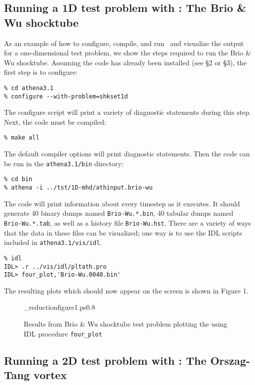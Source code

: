 \subsection{Running a 1D test problem with \ath: The Brio \& Wu shocktube}

As an example of how to configure, compile, and run \ath\ and visualize
the output for a one-dimensional test problem, we show the steps required 
to run the Brio \& Wu shocktube.
Assuming the code has already been installed (see \S2 or \S3), the first step is
to configure:
\begin{verbatim}
% cd athena3.1
% configure --with-problem=shkset1d
\end{verbatim}
The configure script will print a variety of diagnostic statements during
this step.  Next, the code must be compiled:
\begin{verbatim}
% make all
\end{verbatim}
The default compiler options will print diagnostic statements.  Then
the code can be run in the {\tt athena3.1/bin} directory:
\begin{verbatim}
% cd bin
% athena -i ../tst/1D-mhd/athinput.brio-wu
\end{verbatim}
The code will print information about every timestep as it executes.  It
should generate 40 binary dumps named {\tt Brio-Wu.*.bin}, 40 tabular
dumps named {\tt Brio-Wu.*.tab},
as well as a history file {\tt Brio-Wu.hst}.  There
are a variety of ways that the data in these files can be visualized; one
way is to use the IDL scripts included in {\tt athena3.1/vis/idl}.
\begin{verbatim}
% idl
IDL> .r ../vis/idl/pltath.pro
IDL> four_plot,'Brio-Wu.0040.bin'
\end{verbatim}

The resulting plots which should now appear on the screen is shown in Figure 1. 

\begin{figure}[htb!]
\plotone_reduction{figure1.ps}{0.8}
\caption{Results from Brio \& Wu shocktube test problem plotting the using
IDL procedure {\tt four\_plot}}
\end{figure}

\subsection{Running a 2D test problem with \ath: The Orszag-Tang vortex}

